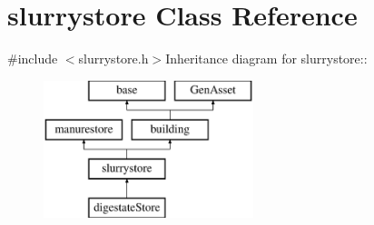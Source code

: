 \hypertarget{classslurrystore}{
\section{slurrystore Class Reference}
\label{classslurrystore}
}


{\ttfamily \#include $<$slurrystore.h$>$}Inheritance diagram for slurrystore::\begin{figure}[H]
\begin{center}
\leavevmode
\includegraphics[height=4cm]{classslurrystore}
\end{center}
\end{figure}

